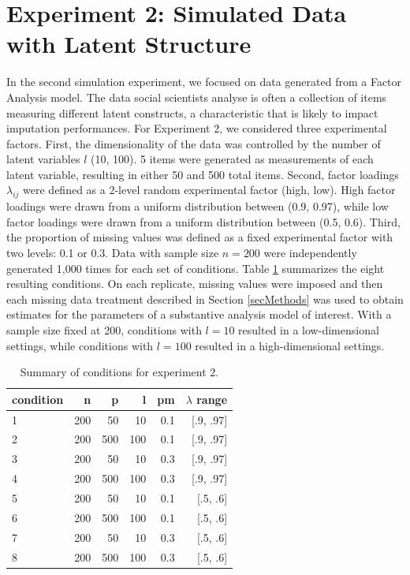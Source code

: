\section{Experiment 2: Simulated Data with Latent Structure}

In the second simulation experiment, we focused on data generated from a Factor Analysis model.
The data social scientists analyse is often a collection of items measuring different latent constructs, 
a characteristic that is likely to impact imputation performances.
For Experiment 2, we considered three experimental factors.
First, the dimensionality of the data was controlled by the number of latent variables $l$ (10, 100).
5 items were generated as measurements of each latent variable, resulting in either 50 and 500 total items.
Second, factor loadings $\lambda_{ij}$ were defined as a 2-level random experimental factor (high, low).
High factor loadings were drawn from a uniform distribution between (0.9, 0.97), while low factor loadings
were drawn from a uniform distribution between (0.5, 0.6).
Third, the proportion of missing values was defined as a fixed experimental factor with two levels: 0.1 or 0.3.
Data with sample size $n=200$ were independently generated 1,000 times for each set of conditions.
Table \ref{tab:condExp2} summarizes the eight resulting conditions.
On each replicate, missing values were imposed and then each missing data treatment described in Section \ref{secMethods}
was used to obtain estimates for the parameters of a substantive analysis model of interest.
With a sample size fixed at 200, conditions with $l = 10$ resulted in a low-dimensional settings, while conditions 
with $l = 100$ resulted in a high-dimensional settings.

\begin{table}
	\centering
	\begin{tabular}{l | r | r | r | r | r }
		condition & n & p & l & pm & $\lambda$ range \\
		\hline
		1 & 200 & 50 &  10 &  0.1 & [.9, .97] \\
		2 & 200 & 500 & 100 & 0.1 & [.9, .97] \\
		3 & 200 & 50 &  10 &  0.3 & [.9, .97] \\
		4 & 200 & 500 & 100 & 0.3 & [.9, .97] \\
		5 & 200 & 50 &  10 &  0.1 & [.5, .6]  \\
		6 & 200 & 500 & 100 & 0.1 & [.5, .6]  \\
		7 & 200 & 50 &  10 &  0.3 & [.5, .6]  \\
		8 & 200 & 500 & 100 & 0.3 & [.5, .6]  \\
	\end{tabular}
	\caption{\label{tab:condExp2}Summary of conditions for experiment 2.}
\end{table}

